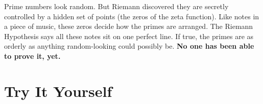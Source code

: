 \documentclass[11pt,a4paper]{article}
\begin{document}
\begin{keybox}[title=The core idea in plain words]
Prime numbers look random. But Riemann discovered they are secretly controlled by a hidden set of points (the zeros of the zeta function). Like notes in a piece of music, these zeros decide how the primes are arranged. The Riemann Hypothesis says all these notes sit on one perfect line. If true, the primes are as orderly as anything random-looking could possibly be. \textbf{No one has been able to prove it, yet.}
\end{keybox}

\section{Try It Yourself}
\end{document}
